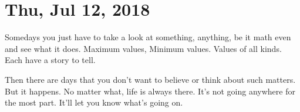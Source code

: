 \section{Thu, Jul 12, 2018}



Somedays you just have to take a look at something, anything, be it math even
and see what it does. Maximum values, Minimum values. Values of all kinds. Each
have a story to tell.

Then there are days that you don't want to believe or think about such matters.
But it happens. No matter what, life is always there. It's not going anywhere
for the most part. It'll let you know what's going on.

